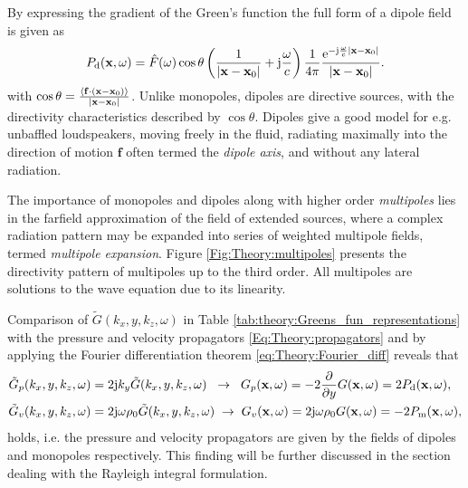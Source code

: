 \begin{itemize}
By expressing the gradient of the Green's function the full form of a dipole field is given as
\begin{equation}
P_{\mathrm{d}}(\mathbf{x},\omega) =  \hat{F}(\omega)
\cos \theta \left(  \frac{1}{|\mathbf{x}-\mathbf{x}_0|} + \mathrm{j} \frac{\omega}{c} \right)
\frac{1}{4\pi}
\frac{\mathrm{e}^{-\mathrm{j} \frac{\omega}{c}|\mathbf{x}-\mathbf{x}_0|}}{|\mathbf{x}-\mathbf{x}_0|}.
\end{equation}
with $\cos \theta = \frac{\left<\mathbf{f} \cdot (\mathbf{x}-\mathbf{x}_0) \right> } {|\mathbf{x}-\mathbf{x}_0|}$.
Unlike monopoles, dipoles are directive sources, with the directivity characteristics described by $\cos \theta$.
Dipoles give a good model for e.g. unbaffled loudspeakers, moving freely in the fluid, radiating maximally into the direction of motion $\mathbf{f}$ often termed the \emph{dipole axis}, and without any lateral radiation.
%
\end{itemize}
The importance of monopoles and dipoles along with higher order \emph{multipoles} lies in the farfield approximation of the field of extended sources, where a complex radiation pattern may be expanded into series of weighted multipole fields, termed \emph{multipole expansion}.
Figure \ref{Fig:Theory:multipoles} presents the directivity pattern of multipoles up to the third order.
All multipoles are solutions to the wave equation due to its linearity.

Comparison of $\tilde{G}(k_x,y,k_z,\omega)$ in Table \ref{tab:theory:Greens_fun_representations}  with the pressure and velocity propagators \eqref{Eq:Theory:propagators} and by applying the Fourier differentiation theorem \eqref{eq:Theory:Fourier_diff} reveals that
\begin{align}
\tilde{G}_p(k_x,y,k_z,\omega) &=  2 \mathrm{j} k_y \tilde{G}(k_x,y,k_z,\omega) 
\hspace{2mm} \rightarrow \hspace{2mm} 
G_p(\mathbf{x},\omega) = -2 \frac{\partial}{\partial y} G(\mathbf{x},\omega) = 2 P_{\mathrm{d}}(\mathbf{x},\omega),
\\
\tilde{G}_v(k_x,y,k_z,\omega) &=  2 \mathrm{j} \omega \rho_0 \tilde{G}(k_x,y,k_z,\omega) 
\hspace{1mm} \rightarrow \hspace{1mm} 
G_v(\mathbf{x},\omega) = 2 \mathrm{j} \omega \rho_0 G(\mathbf{x},\omega) = -2P_{\mathrm{m}}(\mathbf{x},\omega),
\end{align}
holds, i.e. the pressure and velocity propagators are given by the fields of dipoles and monopoles respectively.
This finding will be further discussed in the section dealing with the Rayleigh integral formulation.


